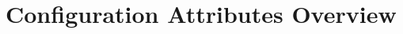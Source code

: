 
%

\renewcommand{\longname}{Configuration Attributes }
\renewcommand{\funcname}{ConfigAttr }
\renewcommand{\shortname}{CA}
\renewcommand{\myauthors}{David Neckels, Chris Hill, Arlindo DaSilva}

\setcounter{section}{0}
\renewcommand{\thesection}{\arabic{section}}
\renewcommand{\thesubsection}{\arabic{section}.\arabic{subsection}}
\renewcommand{\thesubsubsection}{\arabic{section}.\arabic{subsection}.\arabic{subsubsection}}


%


%

\newpage
\section{\longname Overview}

